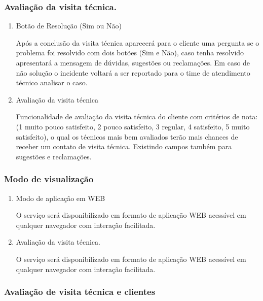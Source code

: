 \documentclass[
    12pt,               %
    openright,          %
    oneside,
    a4paper,            %
    MODELO,             %
    english,            %
    brazil              %
   ]{ifsp-spo-inf-ctds}
\begin{document}
\subsubsection{Avaliação da visita técnica.}

	\begin{enumerate}
		
		\item Botão de Resolução (Sim ou Não)
		
		Após a conclusão da visita técnica aparecerá para o cliente uma pergunta se o problema foi resolvido com dois botões (Sim e Não), caso tenha resolvido apresentará a mensagem de dúvidas, sugestões ou reclamações. Em caso de não solução o incidente voltará a ser reportado para o time de atendimento técnico analisar o caso. 
		
		\item Avaliação da visita técnica
		
		Funcionalidade de avaliação da visita técnica do cliente com critérios de nota:(1 muito pouco satisfeito, 2 pouco satisfeito, 3 regular, 4 satisfeito, 5 muito satisfeito), o qual os técnicos mais bem avaliados terão mais chances de receber um contato de visita técnica. Existindo campos também para sugestões e reclamações.
		
	\end{enumerate}

\subsubsection{Modo de visualização}

	\begin{enumerate}
	
	\item Modo de aplicação em WEB
	
	O serviço será disponibilizado em formato de aplicação WEB acessível em qualquer navegador com interação facilitada.
	
	\item Avaliação da visita técnica.
	
	O serviço será disponibilizado em formato de aplicação WEB acessível em qualquer navegador com interação facilitada.
		
	\end{enumerate}

\subsubsection{Avaliação de visita técnica e clientes}
\end{document}
